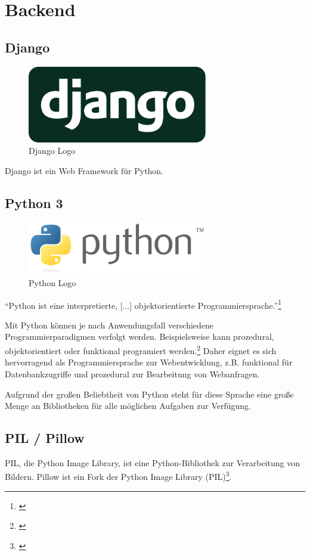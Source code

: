 \section{Backend}
\subsection{Django}
\begin{figure}[h]
  \centering
  \includegraphics[width=0.7\textwidth]{images/django-logo-negative.pdf}
  \caption{Django Logo}
\end{figure}
	Django ist ein Web Framework für Python.
\subsection{Python 3}
\begin{figure}[h]
  \centering
  \includegraphics[width=0.7\textwidth]{images/python-logo.pdf}
  \caption{Python Logo}
\end{figure}
\enquote{Python ist eine interpretierte, [...] objektorientierte Programmiersprache.}\footnote{\citet{pythonFaq}}

Mit Python können je nach Anwendungsfall verschiedene Programmierparadigmen verfolgt werden. Beispielsweise kann prozedural, objektorientiert oder funktional programiert werden.\footnote{\citet{pythonFuncProg}}
Daher eignet es sich hervorragend als Programmiersprache zur Webentwicklung, z.B. funktional für Datenbankzugriffe und prozedural zur Bearbeitung von Webanfragen.

Aufgrund der großen Beliebtheit von Python steht für diese Sprache eine große Menge an Bibliotheken für alle möglichen Aufgaben zur Verfügung.


\subsection{PIL / Pillow}
PIL, die Python Image Library, ist eine Python-Bibliothek zur Verarbeitung von Bildern.
Pillow ist ein Fork der Python Image Library (PIL)\footnote{\citet{pillowdoc}}.

